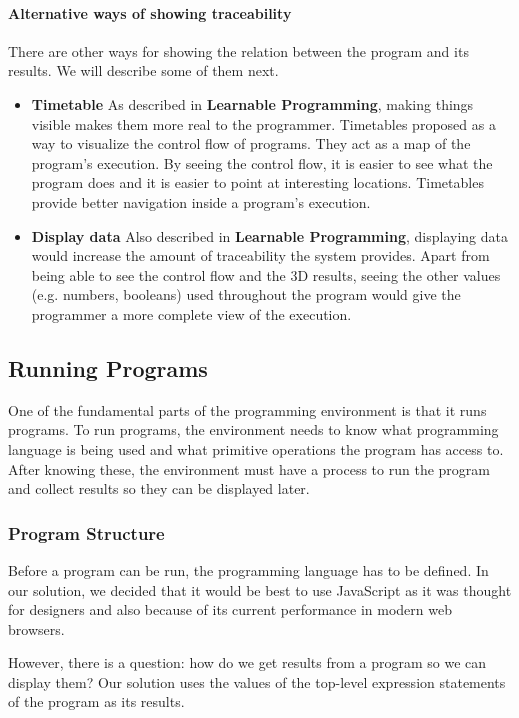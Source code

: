 \paragraph{Alternative ways of showing traceability}
There are other ways for showing the relation between the program and its results.
We will describe some of them next.
\begin{itemize}
  \item {\bf Timetable} As described in {\bf Learnable Programming}\cite{victor2012learnable}, making things visible makes them more real to the programmer. Timetables proposed as a way to visualize the control flow of programs. They act as a map of the program's execution. By seeing the control flow, it is easier to see what the program does and it is easier to point at interesting locations. Timetables provide better navigation inside a program's execution.
  \item {\bf Display data} Also described in {\bf Learnable Programming}\cite{victor2012learnable}, displaying data would increase the amount of traceability the system provides. Apart from being able to see the control flow and the 3D results, seeing the other values (e.g. numbers, booleans) used throughout the program would give the programmer a more complete view of the execution.
\end{itemize}


\subsection{Running Programs}
One of the fundamental parts of the programming environment is that it runs programs.
To run programs, the environment needs to know what programming language is being used and what primitive operations the program has access to.
After knowing these, the environment must have a process to run the program and collect results so they can be displayed later.


\subsubsection{Program Structure}
Before a program can be run, the programming language has to be defined.
In our solution, we decided that it would be best to use JavaScript as it was thought for designers and also because of its current performance in modern web browsers.

However, there is a question: how do we get results from a program so we can display them?
Our solution uses the values of the top-level expression statements of the program as its results.

